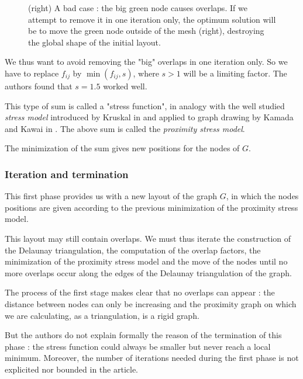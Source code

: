 \documentclass[12pt]{report}
\begin{document}
\begin{figure}[h]
	\center
  \setlength\fboxsep{5pt}
  \setlength\fboxrule{0.5pt}
  \caption{(right) A bad case : the big green node causes overlaps. If we attempt to remove it in one iteration only, the optimum solution will be to move the green node outside of the mesh (right), destroying the global shape of the initial layout.}
  \label{badcase}
\end{figure}

We thus want to avoid removing the "big" overlaps in one iteration only.
So we have to replace $f_{ij}$ by $\min(f_{ij},s)$, where $s > 1$ will be a limiting factor. The authors found that $s = 1.5$ worked well.

This type of sum is called a "stress function", in analogy with the well studied \emph{stress model} introduced by Kruskal in \cite{Kruskal64} and applied to graph drawing by Kamada and Kawai in \cite{Kamada89}. 
The above sum is called the \emph{proximity stress model}.

\bigskip
The minimization of the sum gives new positions for the nodes of $G$.

\subsubsection{Iteration and termination}
This first phase provides us with a new layout of the graph $G$, in which the nodes positions are given according to the previous minimization of the proximity stress model.

This layout may still contain overlaps. We must thus iterate the construction of the Delaunay triangulation, the computation of the overlap factors, the minimization of the proximity stress model and the move of the nodes until no more overlaps occur along the edges of the Delaunay triangulation of the graph.

\bigskip
The process of the first stage makes clear that no overlaps can appear : the distance between nodes can only be increasing and the proximity graph on which we are calculating, as a triangulation, is a rigid graph.

But the authors do not explain formally the reason of the termination of this phase : the stress function could always be smaller but never reach a local minimum. Moreover, the number of iterations needed during the first phase is not explicited nor bounded in the article.
\end{document}
